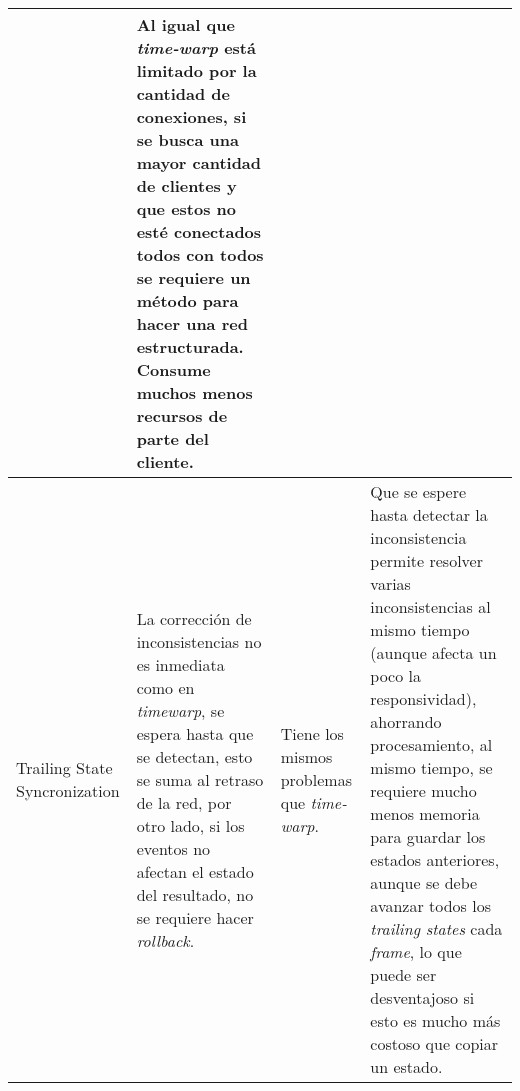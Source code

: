 \begin{longtable}{|p{2cm}|p{4cm}|p{4cm}|p{4cm}|}
&
Al igual que \emph{time-warp} está limitado por la cantidad de conexiones, si se busca una mayor cantidad de clientes y que estos no esté conectados todos con todos se requiere un método para hacer una red estructurada.
\newline Consume muchos menos recursos de parte del cliente.
\\ \hline
Trailing State Syncronization
&
La corrección de inconsistencias no es inmediata como en \emph{timewarp}, se espera hasta que se detectan, esto se suma al retraso de la red, por otro lado, si los eventos no afectan el estado del resultado, no se requiere hacer \emph{rollback}.
&
Tiene los mismos problemas que \emph{time-warp}.
&
Que se espere hasta detectar la inconsistencia permite resolver varias inconsistencias al mismo tiempo (aunque afecta un poco la responsividad), ahorrando procesamiento, al mismo tiempo, se requiere mucho menos memoria para guardar los estados anteriores, aunque se debe avanzar todos los \emph{trailing states} cada \emph{frame}, lo que puede ser desventajoso si esto es mucho más costoso que copiar un estado.
\\ \hline
\end{longtable}
\normalsize





